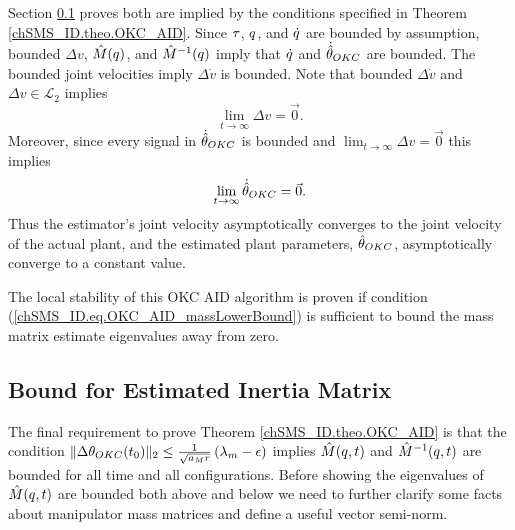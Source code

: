 %
Section \ref{chSMS_ID.sec.OKC_AID_boundM} proves both are implied by the conditions
specified in Theorem \ref{chSMS_ID.theo.OKC_AID}.
%
Since $\tau$, $q$, and $\dot{q}$ are bounded by assumption,
bounded $\Delta v$, $\hat{M}(q)$, and $\hat{M}^{-1}(q)$ imply that
$\dot{q}$ and $\dot{\hat{\theta}}_{OKC}$ are bounded.  The bounded
joint velocities imply $\Delta \dot{v}$ is bounded.  Note that
bounded $\Delta \dot{v}$ and $\Delta v \in \mathcal{L}_2$
implies
%
\begin{equation}
\lim_{t\to \infty}\Delta v=\vec{0}.
\end{equation}
%
Moreover, since every signal in $\dot{\hat{\theta}}_{OKC}$ is
bounded and $\lim_{t\to \infty}\Delta v=\vec{0}$ this implies
%
\begin{equation}
\lim_{t\to \infty}\dot{\hat{\theta}}_{OKC}=\vec{0}.
\end{equation}
%
Thus the estimator's joint velocity asymptotically converges
to the joint velocity of the actual plant, and the estimated plant
parameters, $\hat{\theta}_{OKC}$, asymptotically converge to a constant
value.

The local stability of this \ac{OKC} \ac{AID} algorithm is proven if
condition (\ref{chSMS_ID.eq.OKC_AID_massLowerBound}) is sufficient to
bound the mass matrix estimate eigenvalues away from zero.



\subsection{Bound for Estimated Inertia Matrix}\label{chSMS_ID.sec.OKC_AID_boundM}

The final requirement to prove Theorem \ref{chSMS_ID.theo.OKC_AID} is
that the condition $\|\Delta \theta_{OKC}(t_0)\|_2\leq\frac{1}{\sqrt{a_M
    r}}\left(\lambda_m-\epsilon\right)$ implies 
$\hat{M}(q,t)$ and $\hat{M}^{-1}(q,t)$ are bounded for all
time and all configurations.  Before showing the eigenvalues of
$\hat{M}(q,t)$ are bounded both above and below we need to
further clarify some facts about manipulator mass matrices and define
a useful vector semi-norm.

